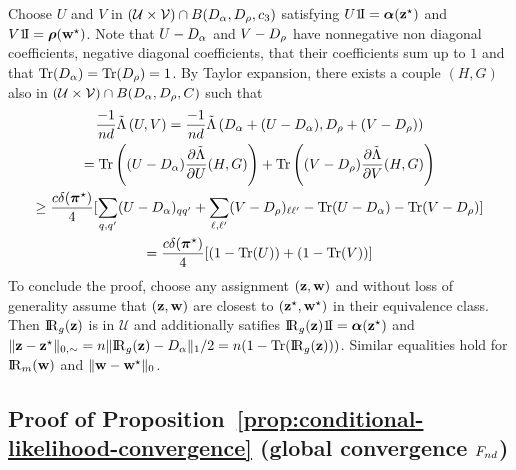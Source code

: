 Choose $U$ and $V$ in $(\mathcal{U} \times \mathcal{V}) \cap B(D_{\alpha}, D_{\rho}, c_3)$ satisfying $U\un = \bpi(\bzs)$ and $V\un = \brho(\bws)$. Note that $U - D_{\alpha}$ and $V - D_{\rho}$ have nonnegative non diagonal coefficients, negative diagonal coefficients, that their coefficients sum up to $1$ and that $\operatorname{Tr}(D_{\alpha}) = \operatorname{Tr}(D_{\rho}) = 1$. By Taylor expansion, there exists a couple $(H, G)$ also in $(\mathcal{U} \times \mathcal{V}) \cap B(D_{\alpha}, D_{\rho}, C)$ such that
\begin{multline*}
\frac{-1}{nd} \Lambtilde\left( U, V \right) =  \frac{-1}{nd} \Lambtilde\left( D_{\pii} + (U - D_{\pii}), D_{\rhoo} + (V - D_{\rhoo}) \right) \\
= \Trace\left((U - D_{\pii}) \frac{\partial \Lambtilde}{\partial U}(H, G) \right) + \Trace\left((V - D_{\rhoo}) \frac{\partial \Lambtilde}{\partial V}(H, G) \right) \\
\geq \frac{c\delta(\bals)}{4} [ \sum_{\kk,\kp} (U - D_{\pii})_{\kk\kp} + \sum_{\el,\lp} (V-D_{\rhoo})_{\el\lp} - \Trace(U - D_{\pii}) - \Trace(V - D_{\rhoo}) ] \\
= \frac{c\delta(\bals)}{4} [ (1 - \Trace(U)) + (1 - \Trace(V))]
\end{multline*}
To conclude the proof, choose any assignment $(\mathbf{z}, \mathbf{w})$ and without loss of generality assume that $(\mathbf{z}, \mathbf{w})$ are closest to $(\mathbf{z}^\star,\mathbf{w}^\star)$ in their equivalence class. Then $\Rgbz$ is in $\mathcal{U}$ and additionally satifies $\Rgbz \un = \bpi(\bzs)$ and $\| \bz - \bzs\|_{0,\sim} = \n \|\Rgbz - D_{\pii}\|_1 /2 = \n(1 - \Trace(\Rgbz))$. Similar equalities hold for $\Rmbw$ and $\| \mathbf{w} - \mathbf{w}^\star\|_{0}$. \proofend


\subsection{Proof of Proposition~\ref{prop:conditional-likelihood-convergence} (global convergence $F_{nd}$)}

